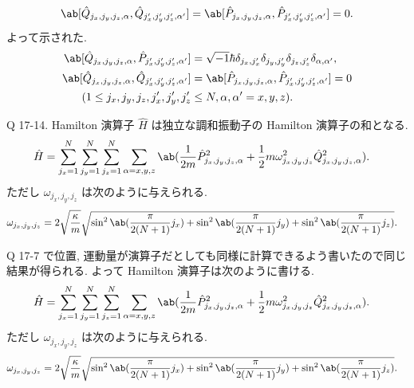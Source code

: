 \documentclass[uplatex,diffipdfmx,a4paper,11pt]{jlreq}
\theoremstyle{definition}
\begin{document}
\begin{align}
  \ab[\hat{Q}_{j_x,j_y,j_z,\alpha}, \hat{Q}_{j_x',j_y',j_z',\alpha'}] = \ab[\hat{P}_{j_x,j_y,j_z,\alpha}, \hat{P}_{j_x',j_y',j_z',\alpha'}] = 0.
\end{align}
よって示された.
\begin{align}
  \ab[\hat{Q}_{j_x,j_y,j_z,\alpha}, \hat{P}_{j_x',j_y',j_z',\alpha'}] & = \sqrt{-1}\hbar\delta_{j_x,j_x'}\delta_{j_y,j_y'}\delta_{j_z,j_z'}\delta_{\alpha,\alpha'}, \\
  \ab[\hat{Q}_{j_x,j_y,j_z,\alpha}, \hat{Q}_{j_x',j_y',j_z',\alpha'}] & = \ab[\hat{P}_{j_x,j_y,j_z,\alpha}, \hat{P}_{j_x',j_y',j_z',\alpha'}] = 0                   \\
  (1\leq j_x,j_y,j_z,j_x',j_y',j_z'                                   & \leq N, \alpha,\alpha' = x,y,z).
\end{align}

\begin{itembox}[l]{Q 17-14.}
  Hamilton 演算子 $\hat{H}$ は独立な調和振動子の Hamilton 演算子の和となる.
  \begin{align}
    \hat{H} & = \sum_{j_x=1}^{N}\sum_{j_y=1}^{N}\sum_{j_z=1}^{N}\sum_{\alpha=x,y,z}\ab(\frac{1}{2m}\hat{P}_{j_x,j_y,j_z,\alpha}^2 + \frac{1}{2}m\omega_{j_x,j_y,j_z}^2\hat{Q}_{j_x,j_y,j_z,\alpha}^2).
  \end{align}
  ただし $\omega_{j_x,j_y,j_z}$ は次のように与えられる.
  \begin{align}
    \omega_{j_x,j_y,j_z} & = 2\sqrt{\frac{\kappa}{m}}\sqrt{\sin^2\ab(\frac{\pi}{2(N+1)}j_x) + \sin^2\ab(\frac{\pi}{2(N+1)}j_y) + \sin^2\ab(\frac{\pi}{2(N+1)}j_z)}.
  \end{align}
\end{itembox}
Q 17-7 で位置, 運動量が演算子だとしても同様に計算できるよう書いたので同じ結果が得られる. よって Hamilton 演算子は次のように書ける.
\begin{align}
  \hat{H} & = \sum_{j_x=1}^{N}\sum_{j_y=1}^{N}\sum_{j_z=1}^{N}\sum_{\alpha=x,y,z}\ab(\frac{1}{2m}\hat{P}_{j_x,j_y,j_z,\alpha}^2 + \frac{1}{2}m\omega_{j_x,j_y,j_z}^2\hat{Q}_{j_x,j_y,j_z,\alpha}^2).
\end{align}
ただし $\omega_{j_x,j_y,j_z}$ は次のように与えられる.
\begin{align}
  \omega_{j_x,j_y,j_z} & = 2\sqrt{\frac{\kappa}{m}}\sqrt{\sin^2\ab(\frac{\pi}{2(N+1)}j_x) + \sin^2\ab(\frac{\pi}{2(N+1)}j_y) + \sin^2\ab(\frac{\pi}{2(N+1)}j_z)}.
\end{align}
\end{document}
